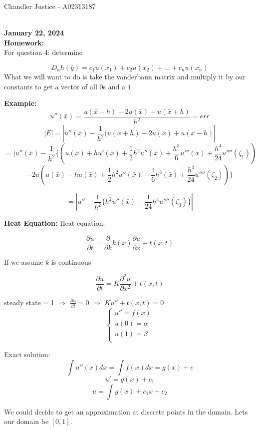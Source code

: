 \documentclass[10pt]{article}
\begin{document}
\begin{flushright}
Chandler Justice - A02313187
\end{flushright}
\noindent \underline{\hspace{3in}}\\
\textbf{January 22, 2024}\\

\textbf{Homework:}\\
For question 4: determine 

\[D_n h(\bar{y}) = c_1 u(x_1) + c_2 u(x_2) + ... + c_n u(x_n)\]
What we will want to do is take the vanderbaun matrix and multiply it by our constants to get a vector of all $0$s and a $1$ 


\textbf{Example:}
\[u''(\bar{x}) = \frac{u(\bar{x} - h) - 2u(\bar{x}) + u( \bar{x} + h)}{h^2} = err\]
\[|E| = |u''(\bar{x}) - \frac{1}{h^2}(u(\bar{x} + h) - 2u(\bar{x}) + u(\bar{x} - h) |\]
\[ = |u''(\bar{x}) - \frac{1}{h^2} \{(u(\bar{x}) + hu'(\bar{x}) + \frac{1}{2} h^2 u''(\bar{x}) + \frac{h^3}{6} u'''(\bar{x}) + \frac{h^4}{24} u''''(\zeta_1))\]
\[-2u (u(\bar{x}) - hu(\bar{x}) + \frac{1}{2}h^2 u''(\bar{x}) - \frac{1}{6}h^3 (\bar{x}) + \frac{h^4}{24}u''''(\zeta_2))\}\]

\[= |u'' - \frac{1}{h^2} \{h^2 u''(\bar{x}) + \frac{1}{24}h^4 u''''(\zeta_3)\}|\]

\textbf{Heat Equation:} Heat equation:

\[\frac{\partial u}{\partial t} = \frac{\partial}{\partial k} k(x) \frac{\partial u}{\partial x} + t (x,t)\]

If we assume $k$ is continuous

\[\frac{\partial u}{\partial t} = K \frac{\partial^2 u}{\partial x^2} + t(x,t)\]

steady state = 1 $\Rightarrow$ $\frac{\partial u}{\partial t}  = 0$ $\Rightarrow$ $K u'' + t(x,t) = 0$\\

\[
    \begin{cases}
        u'' = f(x)\\
        u(0) = \alpha\\
        u(1) = \beta\\
    \end{cases}
\]

Exact solution:
\[\int u''(x) dx = \int f(x) dx = g(x) + c\]
\[u' = g(x) + c_1\]
\[u = \int g(x) + c_1 x + c_2\]

We could decide to get an approximation at discrete points in the domain. Lets our domain be $[0,1]$.\\
\end{document}
